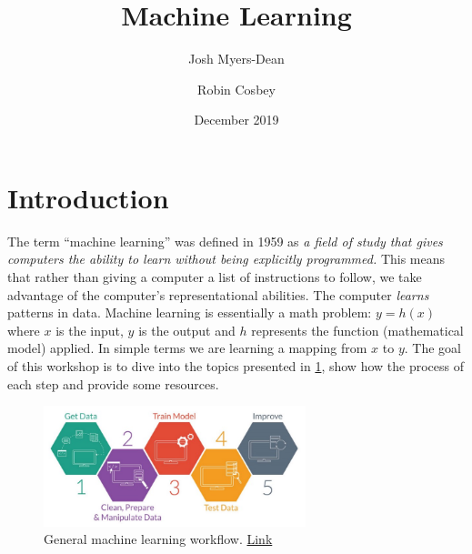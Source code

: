 \documentclass{article}
\title{Machine Learning}
\author{Josh Myers-Dean \and Robin Cosbey}
\date{December 2019}
\begin{document}
\maketitle
\newpage
\tableofcontents
\newpage

\section{Introduction} 
The term ``machine learning'' was defined in 1959 as \textit{a field of study that gives computers the ability to learn without being explicitly programmed.} This means that rather than giving a computer a list of instructions to follow, we take advantage of the computer's representational abilities. The computer \textit{learns} patterns in data. Machine learning is essentially a math problem: $y = h(x)$ where $x$ is the input, $y$ is the output and $h$ represents the function (mathematical model) applied. In simple terms we are learning a mapping from $x$ to $y$. The goal of this workshop is to dive into the topics presented in \ref{fig:flow}, show how the process of each step and provide some resources.

\begin{figure}[H]
    \centering
    \includegraphics[width=3in]{flowchart.jpeg}
    \caption{General machine learning workflow. \href{https://www.freecodecamp.org/news/every-single-machine-learning-course-on-the-internet-ranked-by-your-reviews-3c4a7b8026c0/}{Link}}
    \label{fig:flow}
\end{figure}
\end{document}
